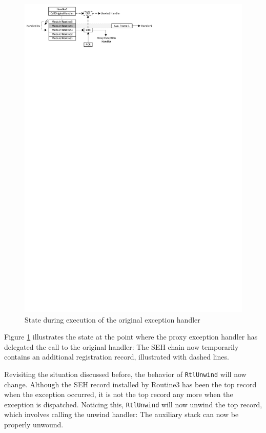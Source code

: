 \begin{figure}[htbp] 
\begin{centering} 
\includegraphics[scale=1.2, clip=true, viewport=0cm 25.5cm 17cm 30cm]{images/diagrams/ExceptionSimpleWithInstrNew.pdf} 
\caption{State during execution of the original exception handler} 
\label{ExceptionSimpleWithInstrNew} 
\end{centering} 
\end{figure}


Figure \ref{ExceptionSimpleWithInstrNew} illustrates the state at the point
where the proxy exception handler has delegated the call to the original
handler: The SEH chain now temporarily contains an additional registration record,
illustrated with dashed lines.

Revisiting the situation discussed before, the behavior of \verb|RtlUnwind|
will now change. Although the SEH record installed by Routine3 has been the
top record when the exception occurred, it is not the top record any more when
the exception is dispatched. Noticing this, \verb|RtlUnwind| will now unwind
the top record, which involves calling the unwind handler: The auxiliary stack
can now be properly unwound.


